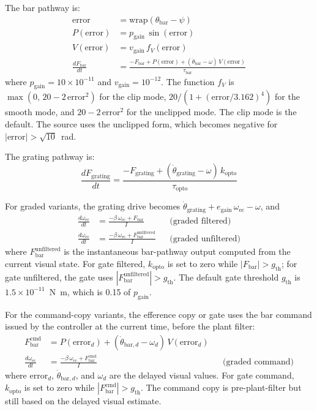 \documentclass[pdflatex,sn-nature]{sn-jnl}
\begin{document}
The bar pathway is:
\begin{align}
\mathrm{error} &= \mathrm{wrap}(\theta_{\mathrm{bar}} - \psi) \\
P(\mathrm{error}) &= p_{\mathrm{gain}}\,\sin(\mathrm{error}) \\
V(\mathrm{error}) &= v_{\mathrm{gain}}\,f_V(\mathrm{error}) \\
\frac{dF_{\mathrm{bar}}}{dt} &= \frac{-F_{\mathrm{bar}} + P(\mathrm{error}) + (\dot\theta_{\mathrm{bar}} - \omega)\,V(\mathrm{error})}{\tau_{\mathrm{bar}}}
\end{align}
where $p_{\mathrm{gain}} = 10\times10^{-11}$ and $v_{\mathrm{gain}} = 10^{-12}$. The function $f_V$ is $\max(0,\,20-2\,\mathrm{error}^2)$ for the clip mode, $20/(1+(\mathrm{error}/3.162)^4)$ for the smooth mode, and $20-2\,\mathrm{error}^2$ for the unclipped mode. The clip mode is the default. The source uses the unclipped form, which becomes negative for $|\mathrm{error}| > \sqrt{10}$~rad.

The grating pathway is:
\begin{equation}
\frac{dF_{\mathrm{grating}}}{dt} = \frac{-F_{\mathrm{grating}} + (\dot\theta_{\mathrm{grating}} - \omega)\,k_{\mathrm{opto}}}{\tau_{\mathrm{opto}}}
\end{equation}

For graded variants, the grating drive becomes $\dot\theta_{\mathrm{grating}} + e_{\mathrm{gain}}\,\omega_{\mathrm{ec}} - \omega$, and
\begin{align}
\frac{d\omega_{\mathrm{ec}}}{dt} &= \frac{-\beta\,\omega_{\mathrm{ec}} + F_{\mathrm{bar}}}{I} && \text{(graded filtered)}\\
\frac{d\omega_{\mathrm{ec}}}{dt} &= \frac{-\beta\,\omega_{\mathrm{ec}} + F_{\mathrm{bar}}^{\mathrm{unfiltered}}}{I} && \text{(graded unfiltered)}
\end{align}
where $F_{\mathrm{bar}}^{\mathrm{unfiltered}}$ is the instantaneous bar-pathway output computed from the current visual state. For gate filtered, $k_{\mathrm{opto}}$ is set to zero while $|F_{\mathrm{bar}}| > g_{\mathrm{th}}$; for gate unfiltered, the gate uses $|F_{\mathrm{bar}}^{\mathrm{unfiltered}}| > g_{\mathrm{th}}$. The default gate threshold $g_{\mathrm{th}}$ is $1.5\times10^{-11}$~N~m, which is 0.15 of $p_{\mathrm{gain}}$.

For the command-copy variants, the efference copy or gate uses the bar command issued by the controller at the current time, before the plant filter:
\begin{align}
F_{\mathrm{bar}}^{\mathrm{cmd}} &= P(\mathrm{error}_d) + (\dot\theta_{\mathrm{bar},d} - \omega_d)\,V(\mathrm{error}_d) \\
\frac{d\omega_{\mathrm{ec}}}{dt} &= \frac{-\beta\,\omega_{\mathrm{ec}} + F_{\mathrm{bar}}^{\mathrm{cmd}}}{I} && \text{(graded command)}
\end{align}
where $\mathrm{error}_d$, $\dot\theta_{\mathrm{bar},d}$, and $\omega_d$ are the delayed visual values. For gate command, $k_{\mathrm{opto}}$ is set to zero while $|F_{\mathrm{bar}}^{\mathrm{cmd}}| > g_{\mathrm{th}}$. The command copy is pre-plant-filter but still based on the delayed visual estimate.
\end{document}
